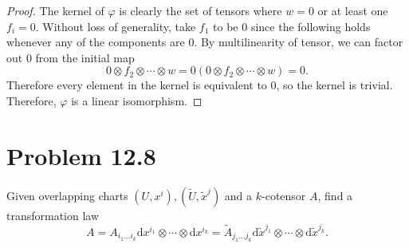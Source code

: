 \documentclass[11pt, letterpaper]{article}
\begin{document}
\begin{proof}
	The kernel of $\varphi $ is clearly the set of tensors where $w=0$ or at least one $f_i=0$. Without loss of generality, take $f_1$ to be 0 since the following holds whenever any of the components are 0. By multilinearity of tensor, we can factor out 0 from the initial map
	\[
		0 \otimes f_2 \otimes \cdots \otimes w = 0\left( 0 \otimes f_2 \otimes \cdots \otimes w \right) =0
	.\]
	Therefore every element in the kernel is equivalent to 0, so the kernel is trivial. Therefore, $\varphi $ is a linear isomorphism.
\end{proof}

\section{Problem 12.8}
\begin{problem}
	Given overlapping charts $(U,x^i),(\widetilde{U} , \widetilde{x} ^j)$ and a $k$-cotensor $A$, find a transformation law
	\[
		A=A_{i_1 \ldots i_k} \mathrm{d} x^{i_1} \otimes \cdots \otimes \mathrm{d} x^{i_k} =\widetilde{A}_{j_1 \ldots j_k} \mathrm{d} \widetilde{x}^{j_1} \otimes \cdots \otimes \mathrm{d} \widetilde{x}^{j_k} 
	.\]
\end{problem}
\end{document}
